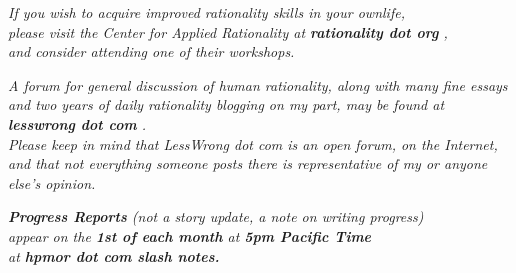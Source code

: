 \emph{If you wish to acquire improved rationality skills in your ownlife,}\\ \emph{please visit the Center for Applied Rationality at
\textbf{rationality dot org} ,}\\ \emph{and consider attending one of their workshops.}

\emph{A forum for general discussion of human rationality, along with many fine essays}\\ \emph{and two years of daily rationality blogging on my part, may be found at \textbf{lesswrong dot com} .}\\ \emph{Please keep in mind that LessWrong dot com is an open forum, on the Internet,}\\ \emph{and that not everything someone posts there is representative of my or anyone else's opinion.}

\emph{\textbf{Progress Reports} (not a story update, a note on writing progress)\\ appear on the \textbf{1st of each month} at \textbf{5pm Pacific Time\\} at \textbf{hpmor dot com slash notes.}}